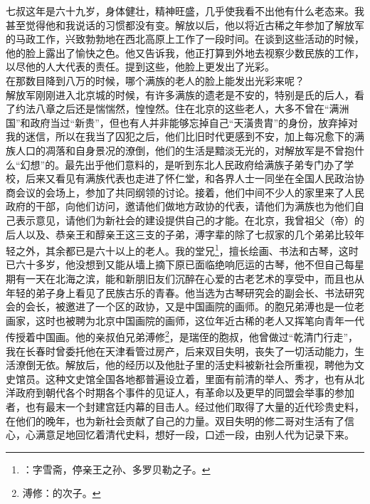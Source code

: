 七叔这年是六十九岁，身体健壮，精神旺盛，几乎使我看不出他有什么老态来。我甚至觉得他和我说话的习惯都没有变。解放以后，他以将近古稀之年参加了解放军的马政工作，兴致勃勃地在西北高原上工作了一段时间。在谈到这些活动的时候，他的脸上露出了愉快之色。他又告诉我，他正打算到外地去视察少数民族的工作，以尽他的人大代表的责任。提到这些，他脸上更发出了光彩。\\

在那数目降到八万的时候，哪个满族的老人的脸上能发出光彩来呢？\\

解放军刚刚进入北京城的时候，有许多满族的遗老是不安的，特别是氏的后人，看了约法八章之后还是惴惴然，惶惶然。住在北京的这些老人，大多不曾在“满洲国”和政府当过“新贵”，但也有人并非能够忘掉自己“天潢贵胄”的身份，放弃掉对我的迷信，所以在我当了囚犯之后，他们比旧时代更感到不安，加上每况愈下的满族人口的凋落和自身景况的潦倒，他们的生活是黯淡无光的，对解放军是不曾抱什么“幻想”的。最先出乎他们意料的，是听到东北人民政府给满族子弟专门办了学校，后来又看见有满族代表也走进了怀仁堂，和各界人士一同坐在全国人民政治协商会议的会场上，参加了共同纲领的讨论。接着，他们中间不少人的家里来了人民政府的干部，向他们访问，邀请他们做地方政协的代表，请他们为满族也为他们自己表示意见，请他们为新社会的建设提供自己的才能。在北京，我曾祖父（帝）的后人以及、恭亲王和醇亲王这三支的子弟，溥字辈的除了七叔家的几个弟弟比较年轻之外，其余都已是六十以上的老人。我的堂兄\footnote{：字雪斋，停亲王之孙、多罗贝勒之子。}，擅长绘画、书法和古琴，这时已六十多岁，他没想到又能从墙上摘下原已面临绝响厄运的古琴，他不但自己每星期有一天在北海之滨，能和新朋旧友们沉醉在心爱的古老艺术的享受中，而且也从年轻的弟子身上看见了民族古乐的青春。他当选为古琴研究会的副会长、书法研究会的会长，被邀进了一个区的政协，又是中国画院的画师。的胞兄弟溥也是一位老画家，这时也被聘为北京中国画院的画师，这位年近古稀的老人又挥笔向青年一代传授着中国画。他的亲叔伯兄弟溥修\footnote{溥修：的次子。}，是瑞侄的胞叔，他曾做过“乾清门行走”，我在长春时曾委托他在天津看管过房产，后来双目失明，丧失了一切活动能力，生活潦倒无依。解放后，他的经历以及他肚子里的活史料被新社会所重视，聘他为文史馆员。这种文史馆全国各地都普遍设立着，里面有前清的举人、秀才，也有从北洋政府到朝代各个时期各个事件的见证人，有革命以及更早的同盟会举事的参加者，也有最末一个封建宫廷内幕的目击人。经过他们取得了大量的近代珍贵史料，在他们的晚年，也为新社会贡献了自己的力量。双目失明的修二哥对生活有了信心，心满意足地回忆着清代史料，想好一段，口述一段，由别人代为记录下来。\\

